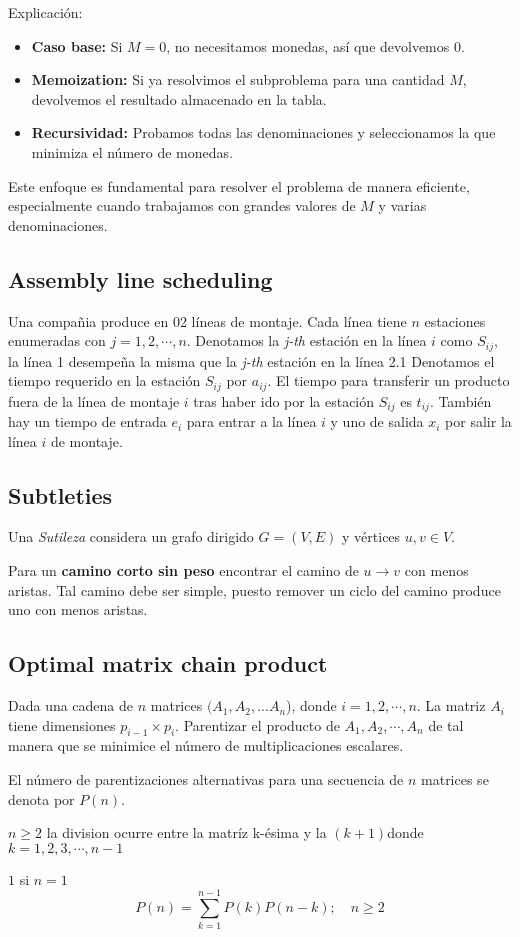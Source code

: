 Explicación:

\begin{itemize}
	\item\textbf{Caso base:} Si $M=0$, no necesitamos monedas, así que devolvemos 0.
	\item\textbf{Memoization:} Si ya resolvimos el subproblema para una cantidad $M$, devolvemos el resultado almacenado en la tabla.
	\item\textbf{Recursividad:} Probamos todas las denominaciones y seleccionamos la que minimiza el número de monedas.
\end{itemize}

Este enfoque es fundamental para resolver el problema de manera eficiente, especialmente cuando trabajamos con grandes valores de $M$ y varias denominaciones.


\subsection{Assembly line scheduling    }
Una compañia produce en 02 líneas de montaje. Cada línea tiene $n$ estaciones enumeradas con $j=1,2,\cdots,n$. Denotamos la \textit{j-th} estación en la línea $i$ como $S_{ij}$, la línea 1 desempeña la misma que la \textit{j-th} estación en la línea 2.1
Denotamos el tiempo requerido en la estación $S_{ij}$ por $a_{ij}$. El tiempo para transferir un producto fuera de la línea de montaje $i$ tras haber ido por la estación $S_{ij}$ es $t_{ij}$.
También hay un tiempo de entrada $e_i$ para entrar a la línea $i$ y uno de salida $x_i$ por salir la línea $i$ de montaje.

\subsection{Subtleties}
Una \textit{Sutileza} considera un grafo dirigido $G=(V,E)$ y vértices $u,v\in V$.

Para un \textbf{camino corto sin peso} encontrar el camino de $u\to
	v$ con menos aristas. Tal camino debe ser simple, puesto remover un ciclo del camino produce uno con menos aristas.



\subsection{Optimal matrix chain product}
Dada una cadena de $n$ matrices $(A_1,A_2,...A_n$), donde $i=1,2,\cdots,n$. La matriz $A_i$ tiene dimensiones $p_{i-1}\times p_i$. Parentizar el producto de $A_1,A_2,\cdots,A_n$ de tal manera que se minimice el número de multiplicaciones escalares.
\begin{fact}
	El número de parentizaciones alternativas para una secuencia de $n$ matrices se denota por $P(n)$.
\end{fact}
\begin{fact}
	$n\ge 2$ la division ocurre entre la matríz k-ésima y la $(k+1) $donde $k=1,2,3,\cdots,n-1$
\end{fact}
\begin{fact}
	$1$ si $n=1$
	$$ P(n)= \sum_{k=1}^{n-1} P(k) P(n-k);\quad n\ge2
	$$
\end{fact}

